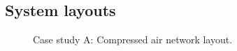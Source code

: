 \begin{appendices}
	
\chapter{System layouts}
\newpage

	\begin{figure}[h!]
		\centering
		\caption{Case study A: Compressed air network layout.}
		\label{fig: BEET Layout}
	\end{figure}


\end{appendices}
